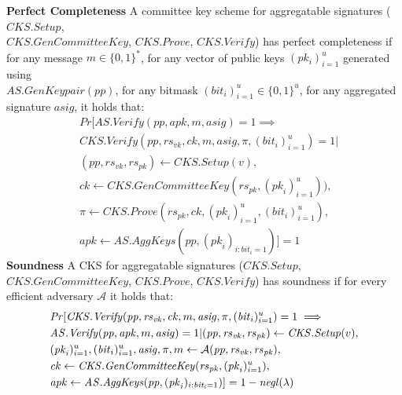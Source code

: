 \begin{definition}
\vspace{-0.1cm}
\noindent \textbf{Perfect Completeness} A committee key scheme for aggregatable signatures 
($\mathit{CKS.Setup}$, \\ $\mathit{CKS.GenCommitteeKey}$, $\mathit{CKS.Prove}$, $\mathit{CKS.Verify}$)
has perfect completeness if for any message $m \in \{0,1\}^*$, 
for any vector of public keys $(\mathit{pk_i})_{i=1}^{u}$ generated using \\ $\mathit{AS.GenKeypair}(\mathit{pp})$, 
for any bitmask $(\mathit{bit_i})_{i=1}^{u} \in \{0,1\}^u$,  for any aggregated signature $\mathit{asig}$, 
it holds that: 
\vspace{-0.1cm}
\begin{align*}
& \mathit{Pr}[\mathit{AS.Verify}(\mathit{pp}, \mathit{apk}, m, \mathit{asig}) = 1 \implies \\
&\mathit{CKS.Verify}(\mathit{pp}, \mathit{rs}_{\mathit{vk}}, \mathit{ck}, m, \mathit{asig}, \pi, (\mathit{bit}_{i})_{i=1}^u) =1 | \\
& (\mathit{pp}, \mathit{rs}_{\mathit{vk}}, \mathit{rs}_{\mathit{pk}}) \leftarrow 
\mathit{CKS.Setup}(v), \\ 
&\mathit{ck} \leftarrow \mathit{CKS.GenCommitteeKey}(\mathit{rs}_{\mathit{pk}}, (\mathit{pk}_{i})_{i=1}^u)), \\
& \pi \leftarrow \mathit{CKS.Prove}(\mathit{rs}_{\mathit{pk}}, \mathit{ck}, (\mathit{pk}_{i})_{i=1}^u, (\mathit{bit_i})_{i=1}^u), \\
&\mathit{apk} \leftarrow \mathit{AS.AggKeys}(\mathit{pp}, (\mathit{pk}_{i})_{i:\mathit{bit_i}=1})]=1
\end{align*} 
\vspace{-0.08cm}
\noindent \textbf{Soundness} A CKS for aggregatable signatures 
($\mathit{CKS.Setup}$, $\mathit{CKS.GenCommitteeKey}$, $\mathit{CKS.Prove}$, $\mathit{CKS.Verify}$)
has soundness if for every efficient adversary $\mathcal{A}$ it holds that: 
\begin{align*}
&\mathit{Pr}[\mathit{CKS.Verify}(\mathit{pp}, \mathit{rs}_{\mathit{vk}}, \mathit{ck}, m,  \mathit{asig}, \pi, (\mathit{bit}_{i})_{i=1}^u) =1 
 \implies \\ & \mathit{AS.Verify}(\mathit{pp}, \mathit{apk}, m, \mathit{asig}) = 1  |  (\mathit{pp}, \mathit{rs}_{\mathit{vk}},\mathit{rs}_{\mathit{pk}}) \leftarrow \mathit{CKS.Setup}(v),\\
& (\mathit{pk}_{i})_{i=1}^u, (\mathit{bit}_{i})_{i=1}^u, \mathit{asig}, \pi, m  \leftarrow \mathcal{A}(\mathit{pp}, \mathit{rs}_{\mathit{vk}}, \mathit{rs}_{\mathit{pk}}), \\
&  \mathit{ck} \leftarrow \mathit{CKS.GenCommitteeKey}(\mathit{rs}_{\mathit{pk}}, (\mathit{pk}_{i})_{i=1}^u), \\
& \mathit{apk} \leftarrow \mathit{AS.AggKeys}( \mathit{pp},( \mathit{pk}_{i})_{i:\mathit{bit_i}=1})] = 1 - \mathit{negl}(\lambda)
\end{align*}
\end{definition}


